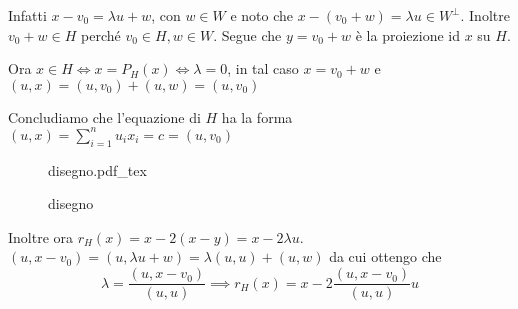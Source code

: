 \documentclass{article}
\newcommand{\incfig}[2][1]{%
    \def\svgwidth{#1\columnwidth}
    {#2.pdf_tex}
}
\theoremstyle{plain}
\theoremstyle{definition}
\theoremstyle{remark}
\begin{document}
    Infatti \(x - v_{0} = \lambda u + w\), con \(w \in W\) e noto che \(x - (v_{0}
    + w) = \lambda u \in W^{\bot}\). Inoltre \(v_{0}+w \in H\) perché \(v_{0}
    \in H, w \in W\). Segue che \(y = v_{0} + w\) è la proiezione id \(x\) su
    \(H\).

    Ora \(x \in H \iff x = P_H(x) \iff \lambda = 0\), in tal caso \(x = v_{0} +
        w\) e \((u, x) = (u, v_{0}) + (u, w) = (u, v_{0})\) 

    Concludiamo che l'equazione di \(H\) ha la forma \((u, x) = \sum_{i=1}^{n}
    u_{i} x_{i} = c = (u, v_{0}) \) 

\begin{figure}[ht]
    \centering
    \incfig{disegno}
    \caption{disegno}
    \label{fig:disegno}
\end{figure}

Inoltre ora \(r_H(x) = x - 2(x - y) = x - 2\lambda u\). \((u, x-v_{0}) = (u,
\lambda u + w) = \lambda (u, u) + (u,w)\) da cui ottengo che 
\[
    \lambda = \frac{(u, x-v_{0})}{(u, u)} \implies r_H(x) = x - 2 \frac{(u, x-
    v_{0})}{(u, u)} u
\]
\end{document}
